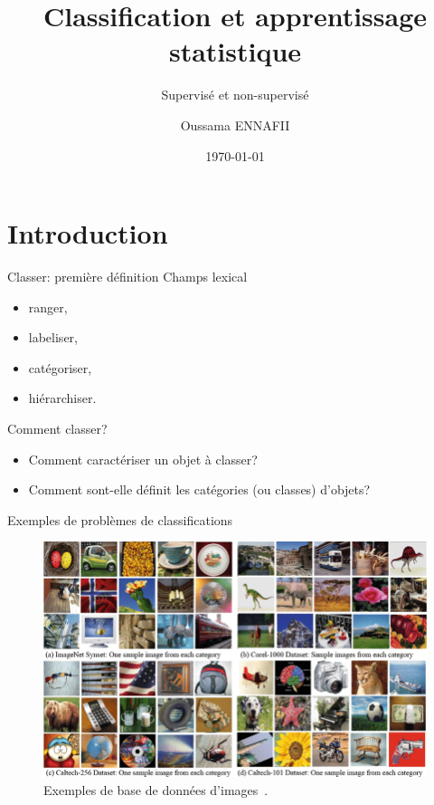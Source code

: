 \documentclass[8pt]{beamer}
\title{Classification et apprentissage statistique}
\subtitle{Supervisé et non-supervisé}
\author{Oussama ENNAFII}
\institute{ENSG}
\date{\today}
\begin{document}
	\begin{frame}[plain]
		\titlepage{}
	\end{frame}

	\section{Introduction}

		\begin{frame}{Classer: première définition}
			Champs lexical
			\begin{itemize}
				\item<2-> ranger,
				\item<3-> labeliser,
				\item<4-> catégoriser,
				\item<5-> hiérarchiser.
			\end{itemize}
		\end{frame}
		
		\begin{frame}{Comment classer?}
			\begin{itemize}
					\item<1-> Comment caractériser un objet à classer?
					\item<2-> Comment sont-elle définit les catégories (ou classes) d'objets?
			\end{itemize}
		\end{frame}

		\begin{frame}{Exemples de problèmes de classifications}
			\begin{figure}[H]
				\includegraphics[width=.7\textwidth]{images/samples/image_datasets}
				\caption*{\tiny Exemples de base de données d'images~\cite{ahmed2017fusion}.}
			\end{figure}
		\end{frame}
		
\end{document}
